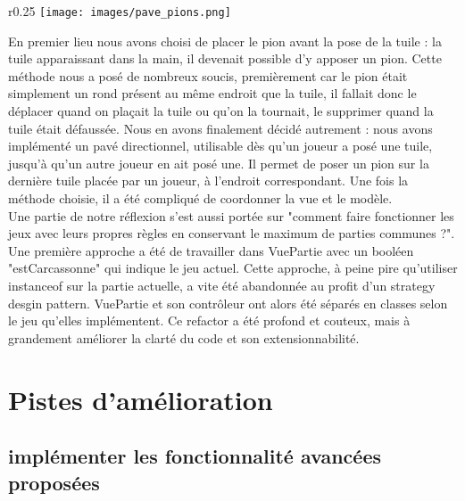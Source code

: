 \documentclass{article}
\begin{document}
    
\begin{wrapfigure}{r}{0.25\textwidth} 
    \centering
    \texttt{[image: images/pave\_pions.png]}
\end{wrapfigure}

En premier lieu nous avons choisi de placer le pion avant la pose de la tuile : la tuile apparaissant dans la main, il devenait possible d'y apposer un pion. Cette méthode nous a posé de nombreux soucis, premièrement car le pion était simplement un rond présent au même endroit que la tuile, il fallait donc le déplacer quand on plaçait la tuile ou qu'on la tournait, le supprimer quand la tuile était défaussée. Nous en avons finalement décidé autrement : nous avons implémenté un pavé directionnel, utilisable dès qu'un joueur a posé une tuile, jusqu'à qu'un autre joueur en ait posé une. Il permet de poser un pion sur la dernière tuile placée par un joueur, à l'endroit correspondant. Une fois la méthode choisie, il a été compliqué de coordonner la vue et le modèle.\\

Une partie de notre réflexion s'est aussi portée sur "comment faire fonctionner les jeux avec leurs propres règles en conservant le maximum de parties communes ?". Une première approche a été de travailler dans VuePartie avec un booléen "estCarcassonne" qui indique le jeu actuel. Cette approche, à peine pire qu'utiliser instanceof sur la partie actuelle, a vite été abandonnée au profit d'un strategy desgin pattern. VuePartie et son contrôleur ont alors été séparés en classes selon le jeu qu'elles implémentent. Ce refactor a été profond et couteux, mais à grandement améliorer la clarté du code et son extensionnabilité.




\section{Pistes d'amélioration}

\subsection{implémenter les fonctionnalité avancées proposées}
\end{document}
